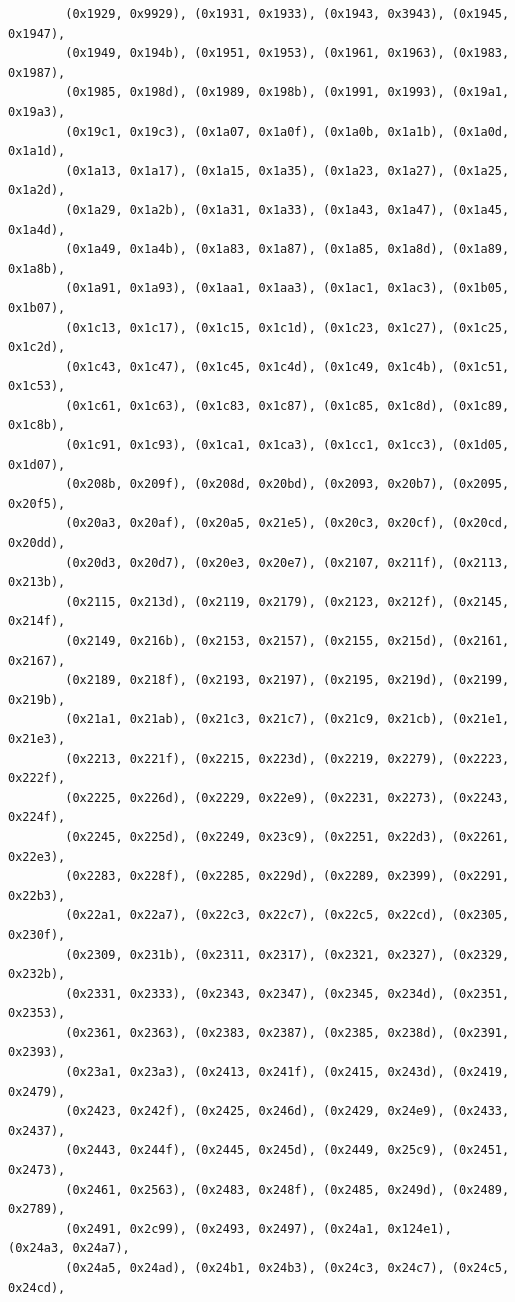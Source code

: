 \documentclass[11pt,a4paper]{article}
\begin{document}
\begin{lstlisting}
        (0x1929, 0x9929), (0x1931, 0x1933), (0x1943, 0x3943), (0x1945, 0x1947),
        (0x1949, 0x194b), (0x1951, 0x1953), (0x1961, 0x1963), (0x1983, 0x1987),
        (0x1985, 0x198d), (0x1989, 0x198b), (0x1991, 0x1993), (0x19a1, 0x19a3),
        (0x19c1, 0x19c3), (0x1a07, 0x1a0f), (0x1a0b, 0x1a1b), (0x1a0d, 0x1a1d),
        (0x1a13, 0x1a17), (0x1a15, 0x1a35), (0x1a23, 0x1a27), (0x1a25, 0x1a2d),
        (0x1a29, 0x1a2b), (0x1a31, 0x1a33), (0x1a43, 0x1a47), (0x1a45, 0x1a4d),
        (0x1a49, 0x1a4b), (0x1a83, 0x1a87), (0x1a85, 0x1a8d), (0x1a89, 0x1a8b),
        (0x1a91, 0x1a93), (0x1aa1, 0x1aa3), (0x1ac1, 0x1ac3), (0x1b05, 0x1b07),
        (0x1c13, 0x1c17), (0x1c15, 0x1c1d), (0x1c23, 0x1c27), (0x1c25, 0x1c2d),
        (0x1c43, 0x1c47), (0x1c45, 0x1c4d), (0x1c49, 0x1c4b), (0x1c51, 0x1c53),
        (0x1c61, 0x1c63), (0x1c83, 0x1c87), (0x1c85, 0x1c8d), (0x1c89, 0x1c8b),
        (0x1c91, 0x1c93), (0x1ca1, 0x1ca3), (0x1cc1, 0x1cc3), (0x1d05, 0x1d07),
        (0x208b, 0x209f), (0x208d, 0x20bd), (0x2093, 0x20b7), (0x2095, 0x20f5),
        (0x20a3, 0x20af), (0x20a5, 0x21e5), (0x20c3, 0x20cf), (0x20cd, 0x20dd),
        (0x20d3, 0x20d7), (0x20e3, 0x20e7), (0x2107, 0x211f), (0x2113, 0x213b),
        (0x2115, 0x213d), (0x2119, 0x2179), (0x2123, 0x212f), (0x2145, 0x214f),
        (0x2149, 0x216b), (0x2153, 0x2157), (0x2155, 0x215d), (0x2161, 0x2167),
        (0x2189, 0x218f), (0x2193, 0x2197), (0x2195, 0x219d), (0x2199, 0x219b),
        (0x21a1, 0x21ab), (0x21c3, 0x21c7), (0x21c9, 0x21cb), (0x21e1, 0x21e3),
        (0x2213, 0x221f), (0x2215, 0x223d), (0x2219, 0x2279), (0x2223, 0x222f),
        (0x2225, 0x226d), (0x2229, 0x22e9), (0x2231, 0x2273), (0x2243, 0x224f),
        (0x2245, 0x225d), (0x2249, 0x23c9), (0x2251, 0x22d3), (0x2261, 0x22e3),
        (0x2283, 0x228f), (0x2285, 0x229d), (0x2289, 0x2399), (0x2291, 0x22b3),
        (0x22a1, 0x22a7), (0x22c3, 0x22c7), (0x22c5, 0x22cd), (0x2305, 0x230f),
        (0x2309, 0x231b), (0x2311, 0x2317), (0x2321, 0x2327), (0x2329, 0x232b),
        (0x2331, 0x2333), (0x2343, 0x2347), (0x2345, 0x234d), (0x2351, 0x2353),
        (0x2361, 0x2363), (0x2383, 0x2387), (0x2385, 0x238d), (0x2391, 0x2393),
        (0x23a1, 0x23a3), (0x2413, 0x241f), (0x2415, 0x243d), (0x2419, 0x2479),
        (0x2423, 0x242f), (0x2425, 0x246d), (0x2429, 0x24e9), (0x2433, 0x2437),
        (0x2443, 0x244f), (0x2445, 0x245d), (0x2449, 0x25c9), (0x2451, 0x2473),
        (0x2461, 0x2563), (0x2483, 0x248f), (0x2485, 0x249d), (0x2489, 0x2789),
        (0x2491, 0x2c99), (0x2493, 0x2497), (0x24a1, 0x124e1), (0x24a3, 0x24a7),
        (0x24a5, 0x24ad), (0x24b1, 0x24b3), (0x24c3, 0x24c7), (0x24c5, 0x24cd),

\end{lstlisting}
\end{document}
